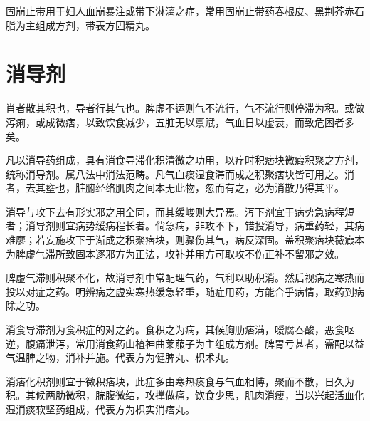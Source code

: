 \documentclass[UTF8]{ctexart}
\begin{document}
固崩止带用于妇人血崩暴注或带下淋漓之症，常用固崩止带药春根皮、黑荆芥赤石脂为主组成方剂，带表方固精丸。

\section{消导剂}
肖者散其积也，导者行其气也。脾虚不运则气不流行，气不流行则停滞为积。或做泻痢，或成微痞，以致饮食减少，五脏无以禀赋，气血日以虚衰，而致危困者多矣。

凡以消导药组成，具有消食导滞化积清微之功用，以疗时积痞块微瘕积聚之方剂，统称消导剂。属八法中消法范畴。凡气血痰湿食滞而成之积聚痞块皆可用之。消者，去其壅也，脏腑经络肌肉之间本无此物，忽而有之，必为消散乃得其平。

消导与攻下去有形实邪之用全同，而其缓峻则大异焉。泻下剂宜于病势急病程短者；消导剂则宜病势缓病程长者。倘急病，非攻不下，错投消导，病重药轻，其病难廖；若妄施攻下于渐成之积聚痞块，则骤伤其气，病反深固。盖积聚痞块薇瘕本为脾虚气滞所致固本逐邪方为正法，攻补并用方可取攻不伤正补不留邪之效。

脾虚气滞则积聚不化，故消导剂中常配理气药，气利以助积消。然后视病之寒热而投以对症之药。明辨病之虚实寒热缓急轻重，随症用药，方能合乎病情，取药到病除之功。

消食导滞剂为食积症的对之药。食积之为病，其候胸肋痞满，嗳腐吞酸，恶食呕逆，腹痛泄泻，常用消食药山楂神曲莱菔子为主组成方剂。脾胃亏甚者，需配以益气温脾之物，消补并施。代表方为健脾丸、枳术丸。

消痞化积剂则宜于微积痞块，此症多由寒热痰食与气血相博，聚而不散，日久为积。其候两肋微积，脘腹微结，攻撑做痛，饮食少思，肌肉消瘦，当以兴起活血化湿消痰软坚药组成，代表方为枳实消痞丸。
\end{document}
